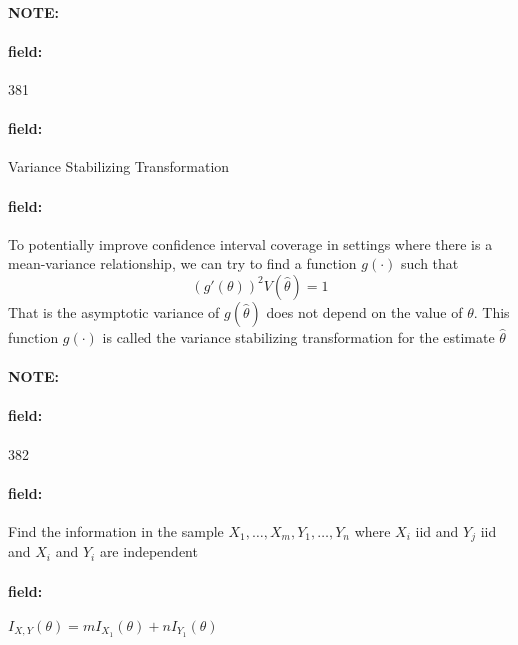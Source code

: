 \documentclass[12pt]{article}
\newenvironment{note}{\paragraph{NOTE:}}{}
\newenvironment{field}{\paragraph{field:}}{}
\begin{document}
\begin{note}
    \begin{field}
        \tiny 381
    \end{field}
    \begin{field}
        Variance Stabilizing Transformation
    \end{field}
    \begin{field}
        To potentially improve confidence interval coverage in settings where there is a mean-variance relationship, we can try to find a function $g(\cdot)$ such that $$(g'(\theta))^2V(\hat{\theta}) = 1 $$ That is the asymptotic variance of $g(\hat{\theta})$ does not depend on the value of $\theta$. This function $g(\cdot)$ is called the variance stabilizing transformation for the estimate $\hat{\theta}$
    \end{field}
\end{note}


\begin{note}
    \begin{field}
        \tiny 382
    \end{field}
    \begin{field}
        Find the information in the sample $X_1, \ldots, X_m, Y_1, \ldots, Y_n$ where $X_i$ iid and $Y_j$ iid and $X_i$ and $Y_i$ are independent
    \end{field}
    \begin{field}
        $I_{X,Y}(\theta) = mI_{X_1}(\theta) + nI_{Y_1}(\theta)$
    \end{field}
\end{note}

\end{document}
